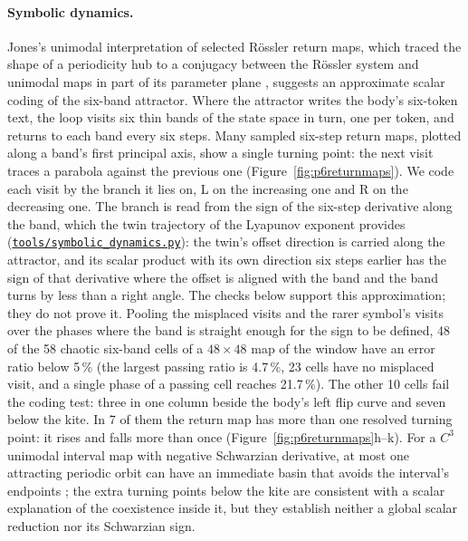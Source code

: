 \documentclass[11pt,letterpaper]{article}
\newcommand{\repourl}{https://github.com/tdj28/neural-shrimp}
\newcommand{\reporef}{arxiv-v1}
\newcommand{\repo}[1]{\href{\repourl/blob/\reporef/#1}{\nolinkurl{#1}}}
\begin{document}
\paragraph{Symbolic dynamics.} Jones's unimodal interpretation of selected R\"ossler return maps, which traced the
shape of a periodicity hub to a conjugacy between the R\"ossler system and unimodal maps in part of its parameter
plane \cite{jones2012rossler}, suggests an approximate
scalar coding of the six-band attractor. Where the attractor writes the body's six-token text, the loop visits six thin
bands of the state space in turn, one per token, and returns to each band every six steps. Many sampled six-step return
maps, plotted along a band's first principal axis, show a single turning point: the next visit traces a parabola against
the previous one (Figure~\ref{fig:p6returnmaps}). We code each visit by the branch it lies on, L on the increasing one
and R on the decreasing one. The branch is read from the sign of the six-step derivative along the band, which the twin
trajectory of the Lyapunov exponent provides (\repo{tools/symbolic_dynamics.py}): the twin's offset direction is carried along the
attractor, and its scalar product with its own direction six steps earlier has the sign of that derivative where the
offset is aligned with the band and the band turns by less than a right angle. The checks below support this
approximation; they do not prove it. Pooling the misplaced visits and the rarer symbol's visits over the phases where
the band is straight enough for the sign to be defined, 48 of the 58 chaotic six-band cells of a $48\times48$ map of
the window have an error ratio below 5\,\% (the largest passing ratio is 4.7\,\%, 23 cells have no misplaced visit, and a single
phase of a passing cell reaches 21.7\,\%). The other 10 cells fail the coding test: three in one column beside the body's left
flip curve and seven below the kite. In 7 of them the return map has more than one resolved turning point: it rises
and falls more than once (Figure~\ref{fig:p6returnmaps}h--k). For a $C^3$ unimodal interval map with negative
Schwarzian derivative, at most one attracting periodic orbit can have an immediate basin that avoids the interval's
endpoints \cite{singer1978stable}; the extra turning points below the kite are consistent with a scalar explanation of
the coexistence inside it, but they establish neither a global scalar reduction nor its Schwarzian sign.
\end{document}
